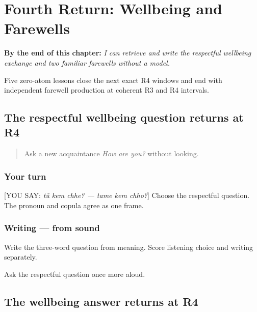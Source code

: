 
\chapter{Fourth Return: Wellbeing and Farewells}
\label{ch:gu-r4-wellbeing-farewells}

\begin{chapteropening}
\textbf{By the end of this chapter:} \emph{I can retrieve and write the respectful wellbeing exchange and two familiar farewells without a model.}

Five zero-atom lessons close the next exact R4 windows and end with independent farewell production at coherent R3 and R4 intervals.
\end{chapteropening}

\section[Practice]{The respectful wellbeing question returns at R4}

\label{lesson:GU-R18-how-are-you-r4}



\begin{quote}
Ask a new acquaintance \emph{How are you?} without looking.
\end{quote}

\subsection*{Your turn}
{[}YOU SAY: \emph{tũ kem chhe? — tame kem chho?}{]} Choose the respectful question. The pronoun and copula agree as one frame.

\subsection*{Writing — from sound}
Write the three-word question from meaning. Score listening choice and writing separately.

\begin{tcolorbox}[breakable,colback=teal!4,colframe=teal!35!black,title={Before you move on}]
Ask the respectful question once more aloud.
\end{tcolorbox}
\section[Practice]{The wellbeing answer returns at R4}

